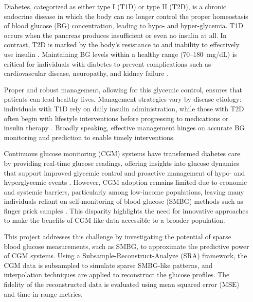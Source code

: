 Diabetes, categorized as either type I (T1D) or type II (T2D), is a chronic endocrine disease in which the body can no longer control the proper homeostasis of blood glucose (BG) concentration, leading to hypo-  and hyper-glycemia. T1D occurs when the pancreas produces insufficient or even no insulin at all. In contrast, T2D is marked by the body's resistance to and inability to effectively use insulin \cite{world_health_organization_global_2016}. Maintaining BG levels within a healthy range (70--180~mg/dL) is critical for individuals with diabetes to prevent complications such as cardiovascular disease, neuropathy, and kidney failure \cite{ADATIR, Roglic2016}. 

Proper and robust management, allowing for this glycemic control, ensures that patients can lead healthy lives. Management strategies vary by disease etiology: individuals with T1D rely on daily insulin administration, while those with T2D often begin with lifestyle interventions before progressing to medications or insulin therapy \cite{Roglic2016}. Broadly speaking, effective management hinges on accurate BG monitoring and prediction to enable timely interventions.

Continuous glucose monitoring (CGM) systems have transformed diabetes care by providing real-time glucose readings, offering insights into glucose dynamics that support improved glycemic control and proactive management of hypo- and hyperglycemic events \cite{Heinemann2018, Beck2017, Battelino2019}. However, CGM adoption remains limited due to economic and systemic barriers, particularly among low-income populations, leaving many individuals reliant on self-monitoring of blood glucose (SMBG) methods such as finger prick samples \cite{Oser2021, ADA}. This disparity highlights the need for innovative approaches to make the benefits of CGM-like data accessible to a broader population.

This project addresses this challenge by investigating the potential of sparse blood glucose measurements, such as SMBG, to approximate the predictive power of CGM systems. Using a Subsample-Reconstruct-Analyze (SRA) framework, the CGM data is subsampled to simulate sparse SMBG-like patterns, and interpolation techniques are applied to reconstruct the glucose profiles. The fidelity of the reconstructed data is evaluated using mean squared error (MSE) and time-in-range metrics. 


